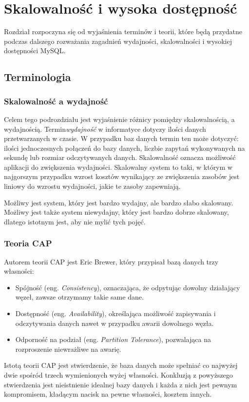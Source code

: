 \section{Skalowalność i wysoka dostępność}
Rozdział rozpoczyna się od wyjaśnienia terminów i teorii, które będą przydatne podczas dalszego rozważania zagadnień wydajności, skalowalności i wysokiej dostępności MySQL.


\subsection{Terminologia}
\subsubsection{Skalowalność a wydajność}
Celem tego podrozdziału jest wyjaśnienie różnicy pomiędzy skalowalnością, a wydajnością. Termin\textit{wydajność} w informatyce dotyczy ilości danych przetwarzanych w czasie. W przypadku baz danych termin ten może dotyczyć: ilości jednoczesnych połączeń do bazy danych, liczbie zapytań wykonywanych na sekundę lub rozmiar odczytywanych danych. Skalowalność oznacza możliwość aplikacji do zwiększenia wydajności. Skalowalny system to taki, w którym w najgorszym przypadku wzrost kosztów wynikający ze zwiększenia zasobów jest liniowy do wzrostu wydajności, jakie te zasoby zapewniają. 

Możliwy jest system, który jest bardzo wydajny, ale bardzo słabo skalowany. Możliwy jest także system niewydajny, który jest bardzo dobrze skalowany, dlatego istotnym jest, aby nie mylić tych pojęć.


\subsubsection{Teoria CAP}
Autorem teorii CAP jest Eric Brewer, który przypisał bazą danych trzy własności:
\begin{itemize}
	\item Spójność (eng. \textit{Consistency}), oznaczająca, że odpytując dowolny działający węzeł, zawsze otrzymamy takie same dane.
	\item Dostępność (eng. \textit{Availability}), określająca możliwość zapisywania i odczytywania danych nawet w przypadku awarii dowolnego węzła.
	\item Odporność na podział (eng. \textit{Partition Tolerance}), pozwalająca na rozproszenie niewrażliwe na awarię.
\end{itemize}
Istotą teorii CAP jest stwierdzenie, że baza danych może spełniać co najwyżej dwie spośród trzech wymienionych wyżej własności. Konkluzją z powyższego stwierdzenia jest nieistnienie idealnej bazy danych i każda z nich jest pewnym kompromisem, kładącym nacisk na pewne własności, kosztem innych.

